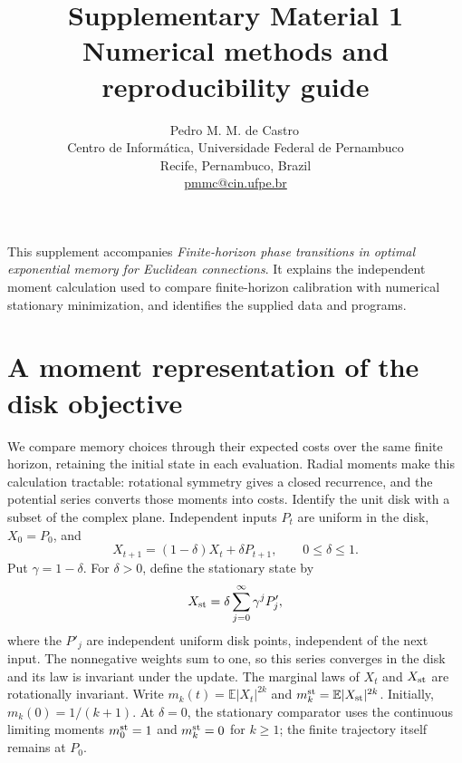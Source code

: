 \documentclass[11pt,a4paper]{article}
\title{Supplementary Material 1\\[5pt]\large Numerical methods and reproducibility guide}
\author{Pedro M. M. de Castro\,\orcidlink{0000-0002-9470-7458}\\\small Centro de Inform\'atica, Universidade Federal de Pernambuco\\\small Recife, Pernambuco, Brazil\\\small\href{mailto:pmmc@cin.ufpe.br}{pmmc@cin.ufpe.br}}
\date{}
\makeatletter
\newcommand{\E}{\mathbb E}
\renewcommand{\maketitle}{\begin{center}{\Large\@title\par}\vspace{1em}{\@author\par}\end{center}\vspace{0.8em}}
\makeatother
\begin{document}
\maketitle
\noindent This supplement accompanies \emph{Finite-horizon phase transitions in optimal exponential memory for Euclidean connections}. It explains the independent moment calculation used to compare finite-horizon calibration with numerical stationary minimization, and identifies the supplied data and programs.

\section{A moment representation of the disk objective}
We compare memory choices through their expected costs over the same finite horizon, retaining the initial state in each evaluation. Radial moments make this calculation tractable: rotational symmetry gives a closed recurrence, and the potential series converts those moments into costs. Identify the unit disk with a subset of the complex plane. Independent inputs $P_t$ are uniform in the disk, $X_0=P_0$, and
\[
X_{t+1}=(1-\delta)X_t+\delta P_{t+1},\qquad 0\leq\delta\leq1.
\]
Put $\gamma=1-\delta$. For $\delta>0$, define the stationary state by
\[
X_{\rm st}=\delta\sum_{j=0}^{\infty}\gamma^jP'_j,
\]
where the $P'_j$ are independent uniform disk points, independent of the next input. The nonnegative weights sum to one, so this series converges in the disk and its law is invariant under the update. The marginal laws of $X_t$ and $X_{\rm st}$ are rotationally invariant. Write $m_k(t)=\E|X_t|^{2k}$ and $m_k^{\rm st}=\E|X_{\rm st}|^{2k}$. Initially, $m_k(0)=1/(k+1)$. At $\delta=0$, the stationary comparator uses the continuous limiting moments $m_0^{\rm st}=1$ and $m_k^{\rm st}=0$ for $k\geq1$; the finite trajectory itself remains at $P_0$.
\end{document}
